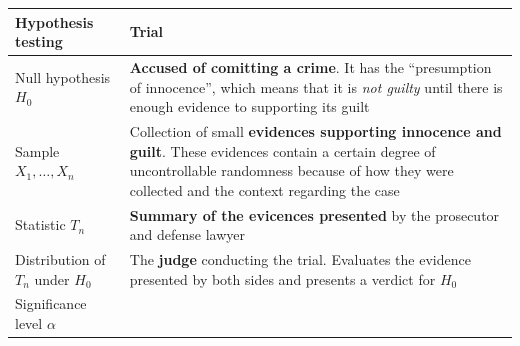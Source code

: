\documentclass[]{book}
\theoremstyle{definition}
\theoremstyle{definition}
\theoremstyle{definition}
\theoremstyle{remark}
\begin{document}
\begin{longtable}[]{@{}ll@{}}
\toprule
\begin{minipage}[b]{0.38\columnwidth}\raggedright\strut
Hypothesis testing\strut
\end{minipage} & \begin{minipage}[b]{0.56\columnwidth}\raggedright\strut
Trial\strut
\end{minipage}\tabularnewline
\midrule
\endhead
\begin{minipage}[t]{0.38\columnwidth}\raggedright\strut
Null hypothesis \(H_0\)\strut
\end{minipage} & \begin{minipage}[t]{0.56\columnwidth}\raggedright\strut
\textbf{Accused of comitting a crime}. It has the ``presumption of
innocence'', which means that it is \emph{not guilty} until there is
enough evidence to supporting its guilt\strut
\end{minipage}\tabularnewline
\begin{minipage}[t]{0.38\columnwidth}\raggedright\strut
Sample \(X_1,\ldots,X_n\)\strut
\end{minipage} & \begin{minipage}[t]{0.56\columnwidth}\raggedright\strut
Collection of small \textbf{evidences supporting innocence and guilt}.
These evidences contain a certain degree of uncontrollable randomness
because of how they were collected and the context regarding the
case\strut
\end{minipage}\tabularnewline
\begin{minipage}[t]{0.38\columnwidth}\raggedright\strut
Statistic \(T_n\)\strut
\end{minipage} & \begin{minipage}[t]{0.56\columnwidth}\raggedright\strut
\textbf{Summary of the evicences presented} by the prosecutor and
defense lawyer\strut
\end{minipage}\tabularnewline
\begin{minipage}[t]{0.38\columnwidth}\raggedright\strut
Distribution of \(T_n\) under \(H_0\)\strut
\end{minipage} & \begin{minipage}[t]{0.56\columnwidth}\raggedright\strut
The \textbf{judge} conducting the trial. Evaluates the evidence
presented by both sides and presents a verdict for \(H_0\)\strut
\end{minipage}\tabularnewline
\begin{minipage}[t]{0.38\columnwidth}\raggedright\strut
Significance level \(\alpha\)\strut

\end{minipage}
\end{longtable}
\end{document}
